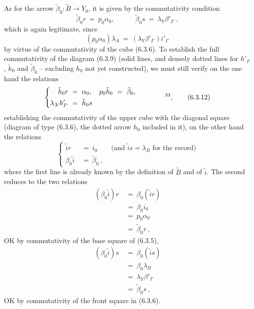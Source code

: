 As for the arrow $\tilde{\beta}_0 : \tilde{B} \longrightarrow Y_0$, it is given by the commutativity condition
\[
\tilde{\beta}_0r \ =\ p_0\alpha_0, \qquad\quad \tilde{\beta}_0s \ =\ \lambda_Y\beta'_{I'}\ ,
\tag*{(6.3.11)}
\]
which is again legitimate, since
\[
(p_0\alpha_0)\lambda_A \ =\ (\lambda_Y\beta'_{I'})i'_{I'}
\]
by virtue of the commutativity of the cube (6.3.6). To establish the full commutativity of the diagram (6.3.9) (solid lines, and densely dotted lines for $h'_{I'}$, $\tilde{h}_0$ and $\tilde{\beta}_0$ -- excluding $h_0$ not yet constructed), we must still verify on the one hand the relations %
\[
\left\{
\begin{aligned}
\tilde{h}_0r \ &=\ \alpha_0, \quad p_0\tilde{h}_0 \ =\ \tilde{\beta}_0, \\
\lambda_X h'_{I'} \ &=\ \tilde{h}_0s
\end{aligned}
\right.
\qquad\qquad \text{\footnotemark[33]},
\tag*{(6.3.12)}
\]
establishing the commutativity of the upper cube with the diagonal square (diagram of type (6.3.6), the dotted arrow $h_0$ included in it), on the other hand the relations
\[
\left\{
\begin{aligned}
\tilde{i}r \ &=\ i_0 \qquad \text{(and $\tilde{i}s = \lambda_B$ for the record)} \\
\beta_0\tilde{i} \ &=\ \tilde{\beta}_0\ ,
\end{aligned}
\right.
\tag*{(6.3.13)}
\]
where the first line is already known by the definition of $\tilde{B}$ and of $\tilde{i}$. The second
reduces to the two relations
\[
\begin{aligned}
(\beta_0\tilde{i})r \ &=\ \beta_0(\tilde{i}r) \\
&=\ \beta_0i_0 \\
&=\ p_0\alpha_0 \\
&=\ \tilde{\beta}_0r\ ,
\end{aligned}
\]
OK by commutativity of the base square of (6.3.5),
\[
\begin{aligned}
(\beta_0\tilde{i})s \ &=\ \beta_0(\tilde{i}s) \\
&=\ \beta_0\lambda_B \\
&=\ \lambda_Y\beta'_{I'} \\
&=\ \tilde{\beta}_0s\ ,
\end{aligned}
\]
OK by commutativity of the front square in (6.3.6).

